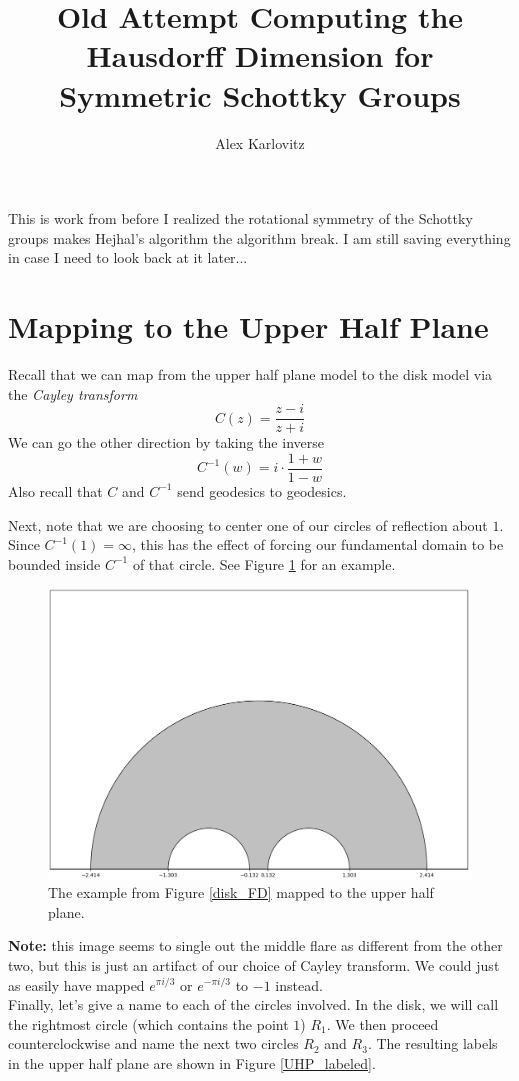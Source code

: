 \documentclass[]{article}
\title{Old Attempt Computing the Hausdorff Dimension for Symmetric Schottky Groups}
\author{Alex Karlovitz}
\date{}
\begin{document}
	
	\maketitle

This is work from before I realized the rotational symmetry of the Schottky groups makes Hejhal's algorithm the algorithm break.
I am still saving everything in case I need to look back at it later...

\section*{Mapping to the Upper Half Plane}

Recall that we can map from the upper half plane model to the disk model via the \textit{Cayley transform}
$$
C(z) = \frac{z - i}{z + i}
$$
We can go the other direction by taking the inverse
$$
C^{-1}(w) = i\cdot\frac{1 + w}{1 - w}
$$
Also recall that $C$ and $C^{-1}$ send geodesics to geodesics.

Next, note that we are choosing to center one of our circles of reflection about $1$.
Since $C^{-1}(1) = \infty$, this has the effect of forcing our fundamental domain to be bounded inside $C^{-1}$ of that circle.
See Figure \ref{UHP_FD} for an example.

\begin{figure}[h]
	\centering
	\includegraphics[width=0.6\linewidth]{../UHP_FD.png}
	\caption{The example from Figure \ref{disk_FD} mapped to the upper half plane.}
	\label{UHP_FD}
\end{figure}

\textbf{Note:} this image seems to single out the middle flare as different from the other two, but this is just an artifact of our choice of Cayley transform.
We could just as easily have mapped $e^{\pi i/3}$ or $e^{-\pi i/3}$ to $-1$ instead.
\\

Finally, let's give a name to each of the circles involved.
In the disk, we will call the rightmost circle (which contains the point $1$) $R_1$.
We then proceed counterclockwise and name the next two circles $R_2$ and $R_3$.
The resulting labels in the upper half plane are shown in Figure \ref{UHP_labeled}.
\end{document}
